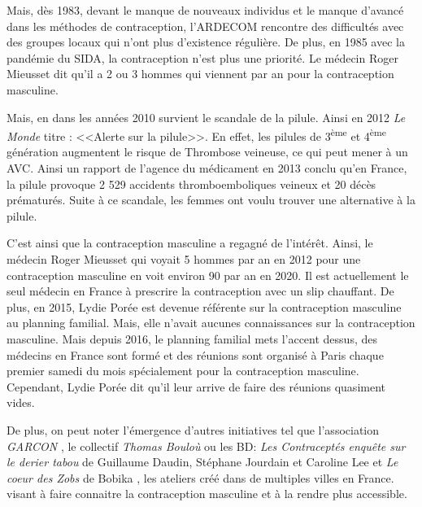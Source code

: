 \documentclass[12pt,a4paper]{report}
\begin{document}
Mais, dès 1983, devant le manque de nouveaux individus et le manque d'avancé dans les méthodes de contraception, l'ARDECOM rencontre des difficultés avec des groupes locaux qui n'ont plus d'existence régulière.
De plus, en 1985 avec la pandémie du SIDA, la contraception n'est plus une priorité.
Le médecin Roger Mieusset dit qu'il a 2 ou 3 hommes qui viennent par an pour la contraception masculine. \cite{guillaumedaudinContraceptesEnqueteDernier2022}

Mais, en dans les années 2010 survient le scandale de la pilule. Ainsi en 2012 \textit{Le Monde} titre : <<Alerte sur la pilule>>.
En effet, les pilules de 3\textsuperscript{ème} et 4\textsuperscript{ème} génération augmentent le risque de Thrombose veineuse, ce qui peut mener à un AVC.
Ainsi un rapport de l'agence du médicament en 2013 conclu qu'en France, la pilule provoque 2 529 accidents thromboemboliques veineux et 20 décès prématurés.
Suite à ce scandale, les femmes ont voulu trouver une alternative à la pilule. \cites{albrechtQuelleEstPlace2023}{guillaumedaudinContraceptesEnqueteDernier2022}{AlertePilule2012}

C'est ainsi que la contraception masculine a regagné de l'intérêt. Ainsi, le médecin Roger Mieusset qui voyait 5 hommes par an en 2012 pour une contraception masculine en voit environ 90 par an en 2020.\cite{guillaumedaudinContraceptesEnqueteDernier2022}
Il est actuellement le seul médecin en France à prescrire la contraception avec un slip chauffant.\cite{bobikaCoeurZobs2022}
De plus, en 2015, Lydie Porée est devenue référente sur la contraception masculine au planning familial.
Mais, elle n'avait aucunes connaissances sur la contraception masculine.
Mais depuis 2016, le planning familial mets l'accent dessus, des médecins en France sont formé et des réunions sont organisé à Paris chaque premier samedi du mois spécialement pour la contraception masculine.
Cependant, Lydie Porée dit qu'il leur arrive de faire des réunions quasiment vides. \cite{guillaumedaudinContraceptesEnqueteDernier2022}

De plus, on peut noter l'émergence d'autres initiatives tel que l'association \textit{GARCON} \cite{QuiSommesNous}, le collectif \textit{Thomas Bouloù} \cite{ThomasBoulouInterview} ou les BD: \textit{Les Contraceptés enquête sur le derier tabou} de Guillaume Daudin, Stéphane Jourdain et Caroline Lee \cite{guillaumedaudinContraceptesEnqueteDernier2022} et \textit{Le coeur des Zobs} de Bobika \cite{bobikaCoeurZobs2022}, les ateliers créé dans de multiples villes en France. \cites{ContraceptionMasculineComment2023}{OuNousTrouver}{guillaumedaudinContraceptesEnqueteDernier2022} visant à faire connaitre la contraception masculine et à la rendre plus accessible.
\end{document}
